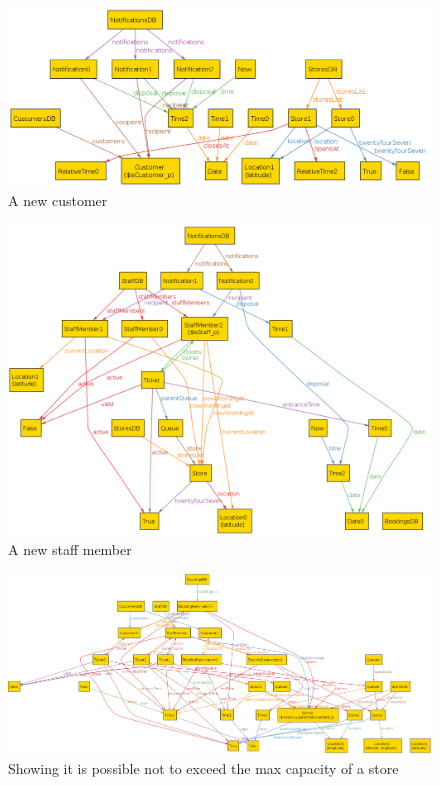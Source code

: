 \begin{figure} [H]
	\includegraphics[width=\linewidth]{../Alloy/isCustomer.png}
	\caption{A new customer}
	\label{fig:alloyIsCustomer}
\end{figure}

\begin{figure} [H]
	\includegraphics[width=\linewidth]{../Alloy/isStaff.png}
	\caption{A new staff member}
	\label{fig:alloyIsStaff}
\end{figure}

\begin{figure} [H]
	\includegraphics[width=\linewidth]{../Alloy/maxOccupantsNotExceeded.png}
	\caption{Showing it is possible not to exceed the max capacity of a store}
	\label{fig:maxOccupantsNotExceeded}
\end{figure}

